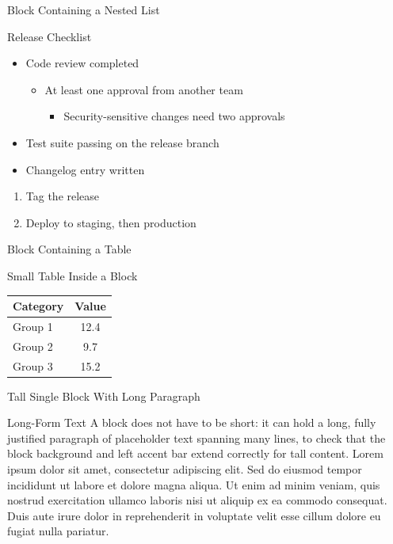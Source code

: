 \documentclass[aspectratio=169]{beamer}
\begin{document}
\begin{frame}{Block Containing a Nested List}
  \begin{block}{Release Checklist}
    \begin{itemize}
      \item Code review completed
      \begin{itemize}
        \item At least one approval from another team
        \begin{itemize}
          \item Security-sensitive changes need two approvals
        \end{itemize}
      \end{itemize}
      \item Test suite passing on the release branch
      \item Changelog entry written
    \end{itemize}
    \begin{enumerate}
      \item Tag the release
      \item Deploy to staging, then production
    \end{enumerate}
  \end{block}
\end{frame}

\begin{frame}{Block Containing a Table}
  \begin{block}{Small Table Inside a Block}
    \centering
    \begin{tabular}{lc}
      \toprule
      \textbf{Category} & \textbf{Value} \\
      \midrule
      Group 1 & 12.4 \\
      Group 2 & 9.7  \\
      Group 3 & 15.2 \\
      \bottomrule
    \end{tabular}
  \end{block}
\end{frame}

\begin{frame}{Tall Single Block With Long Paragraph}
  \begin{block}{Long-Form Text}
    {\small A block does not have to be short: it can hold a long,
    fully justified paragraph of placeholder text spanning many
    lines, to check that the block background and left accent bar
    extend correctly for tall content. Lorem ipsum dolor sit amet,
    consectetur adipiscing elit. Sed do eiusmod tempor incididunt ut
    labore et dolore magna aliqua. Ut enim ad minim veniam, quis
    nostrud exercitation ullamco laboris nisi ut aliquip ex ea
    commodo consequat. Duis aute irure dolor in reprehenderit in
    voluptate velit esse cillum dolore eu fugiat nulla pariatur.}
  \end{block}
\end{frame}
\end{document}
